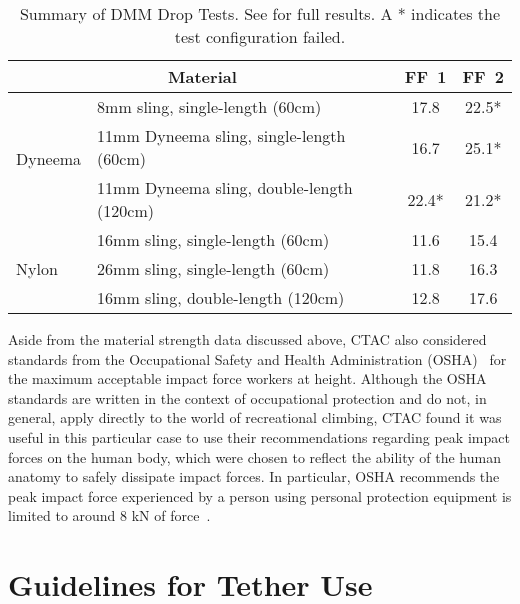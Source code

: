 \documentclass[nonacm,acmtog]{acmart}
\begin{document}
   \begin{table}
      \centering
      \Small
      \begin{tabular}{|l|l||cc|}
      \hline
      \multicolumn{2}{|c||}{\bf Material} &
         {\bf FF~1} &
         {\bf FF~2} \\
      \hline
      \multirow{3}{*}{Dyneema} &
         8mm sling, single-length (60cm) &
         17.8 &
         22.5* \\
         &
         11mm Dyneema sling, single-length (60cm) &
         16.7 &
         25.1* \\
         &
         11mm Dyneema sling, double-length (120cm) &
         22.4* &
         21.2* \\
      \hline
      \multirow{3}{*}{Nylon} &
         16mm sling, single-length (60cm) &
         11.6 &
         15.4 \\
         &
         26mm sling, single-length (60cm) &
         11.8 &
         16.3 \\
         &
         16mm sling, double-length (120cm) &
         12.8 &
         17.6 \\
      \hline
      \end{tabular}
      \caption{Summary of DMM Drop Tests.  See \cite{dmm-pull-tests} for full
         results.  A * indicates the test configuration failed.}
      \label{tab:dmm-results}
   \end{table}

   Aside from the material strength data discussed above, CTAC also considered
   standards from the Occupational Safety and Health
   Administration (OSHA)~\cite{ref:osha} for the maximum acceptable impact force
   workers at height.  Although the OSHA standards are written in the context
   of occupational protection and do not, in general, apply directly to the
   world of recreational climbing, CTAC found it was useful in this particular
   case to use their recommendations regarding peak impact forces on the human
   body, which were chosen to reflect the ability of the human anatomy to
   safely dissipate impact forces.  In particular, OSHA recommends the peak
   impact force experienced by a person using personal protection equipment is
   limited to around 8 kN of force~\cite[\S1910.140(d)(1)(i)]{ref:osha-peak}.

\section{Guidelines for Tether Use}
\label{sec:guidelines}
\end{document}
